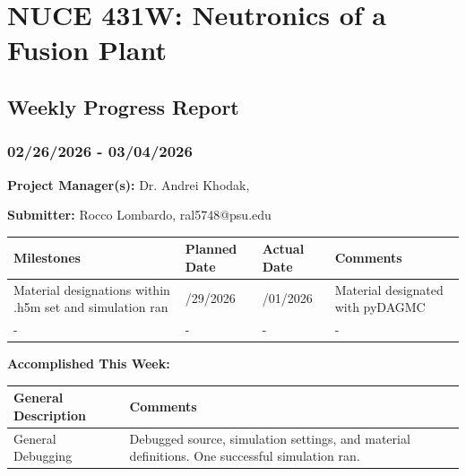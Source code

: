\documentclass{article}
\begin{document}
{\centering \section*{NUCE 431W: Neutronics of a Fusion Plant}

\subsection*{Weekly Progress Report}

\subsubsection*{02/26/2026 - 03/04/2026}}


\hrulefill

\bigskip

\textbf{Project Manager(s):} Dr. Andrei Khodak,  

\bigskip

\textbf{Submitter:} Rocco Lombardo, ral5748@psu.edu

\bigskip

\renewcommand{\arraystretch}{1.5}
\begin{table}[H]
    \centering
    \begin{tabularx}{0.95\textwidth} { 
        | >{\centering\arraybackslash}X 
        | >{\centering\arraybackslash}X 
        | >{\centering\arraybackslash}X
        | >{\centering\arraybackslash}X | }

    \hline
    \textbf{Milestones} & \textbf{Planned Date} & \textbf{Actual Date} & \textbf{Comments} \\
    \hline
    Material designations within .h5m set and simulation ran  & 02/29/2026 & 03/01/2026 & Material designated with pyDAGMC  \\
    \hline
    - & - & - & - \\
    \hline
    \end{tabularx}
\end{table}

\bigskip

\textbf{Accomplished This Week: }

\renewcommand{\arraystretch}{1.5}
\begin{table}[H]
    \centering
    \begin{tabularx}{0.95\textwidth} { 
        | >{\centering\arraybackslash}X
        | >{\centering\arraybackslash}X | }

    \hline
    \textbf{General Description} & \textbf{Comments} \\
    \hline
    General Debugging  & Debugged source, simulation settings, and material definitions. One successful simulation ran. \\
    \hline
    \end{tabularx}
\end{table}
\end{document}
